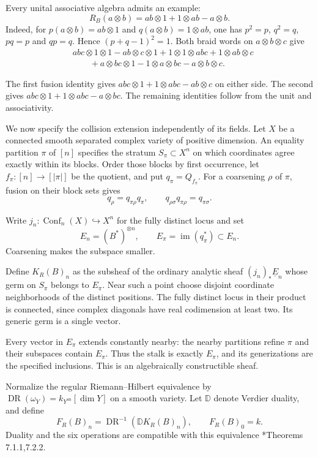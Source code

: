 Every unital associative algebra admits an example:
\begin{equation}\label{cycmp:eq:context-exchange}
 R_B(a\otimes b)=ab\otimes1+1\otimes ab-a\otimes b.
\end{equation}
Indeed, for $p(a\otimes b)=ab\otimes1$ and
$q(a\otimes b)=1\otimes ab$, one has
$p^2=p$, $q^2=q$, $pq=p$ and $qp=q$. Hence $(p+q-1)^2=1$.
Both braid words on $a\otimes b\otimes c$ give
\[
\begin{split}
 &abc\otimes1\otimes1-ab\otimes c\otimes1
       +1\otimes1\otimes abc+1\otimes ab\otimes c\\
 &\qquad+a\otimes bc\otimes1-1\otimes a\otimes bc
       -a\otimes b\otimes c.
\end{split}
\]

The first fusion identity gives
$abc\otimes1+1\otimes abc-ab\otimes c$ on either side.
The second gives $abc\otimes1+1\otimes abc-a\otimes bc$.
The remaining identities follow from the unit and associativity.

We now specify the collision extension independently of its fields.
Let $X$ be a connected smooth separated complex variety of positive
dimension. An equality partition $\pi$ of $[n]$ specifies the stratum
$S_\pi\subset X^n$ on which coordinates agree exactly within its
blocks. Order those blocks by first occurrence, let
$f_\pi:[n]\to[|\pi|]$ be the quotient, and put $q_\pi=Q_{f_\pi}$.
For a coarsening $\rho$ of $\pi$, fusion on their block sets gives
\[
 q_\rho=q_{\pi\rho}q_\pi,\qquad
 q_{\rho\sigma}q_{\pi\rho}=q_{\pi\sigma}.
\]

Write $j_n:\operatorname{Conf}_n(X)\hookrightarrow X^n$ for the
fully distinct locus and set
\[
 E_n=(B^*)^{\otimes n},\qquad E_\pi=\operatorname{im}(q_\pi^*)\subset E_n.
\]
Coarsening makes the subspace smaller.

Define $K_R(B)_n$ as the subsheaf of the ordinary analytic sheaf
$(j_n)_*\underline E_n$ whose germ on $S_\pi$ belongs to $E_\pi$.
Near such a point choose disjoint coordinate neighborhoods of the
distinct positions. The fully distinct locus in their product is
connected, since complex diagonals have real codimension at least
two. Its generic germ is a single vector.

Every vector in $E_\pi$
extends constantly nearby: the nearby partitions refine $\pi$ and
their subspaces contain $E_\pi$. Thus the stalk is exactly $E_\pi$,
and its generizations are the specified inclusions. This is an
algebraically constructible sheaf.

Normalize the regular Riemann--Hilbert equivalence by
$\operatorname{DR}(\omega_Y)=k_{Y^{\mathrm{an}}}[\dim Y]$ on a smooth
variety. Let $\mathbb D$ denote Verdier duality, and define
\begin{equation}\label{cycmp:eq:exchange-coefficient}
 F_R(B)_n=\operatorname{DR}^{-1}(\mathbb D K_R(B)_n),
 \qquad F_R(B)_0=k.
\end{equation}
Duality and the six operations are compatible with this equivalence
\cite{cycmp:HTT}*{Theorems 7.1.1,7.2.2}.

